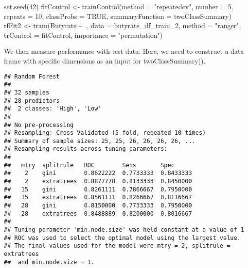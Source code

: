 \documentclass[
  oneside]{book}
\newenvironment{Shaded}{\begin{snugshade}}{\end{snugshade}}
\newcommand{\AttributeTok}[1]{\textcolor[rgb]{0.77,0.63,0.00}{#1}}
\newcommand{\CommentTok}[1]{\textcolor[rgb]{0.56,0.35,0.01}{\textit{#1}}}
\newcommand{\ConstantTok}[1]{\textcolor[rgb]{0.00,0.00,0.00}{#1}}
\newcommand{\DecValTok}[1]{\textcolor[rgb]{0.00,0.00,0.81}{#1}}
\newcommand{\FunctionTok}[1]{\textcolor[rgb]{0.00,0.00,0.00}{#1}}
\newcommand{\NormalTok}[1]{#1}
\newcommand{\OtherTok}[1]{\textcolor[rgb]{0.56,0.35,0.01}{#1}}
\newcommand{\SpecialCharTok}[1]{\textcolor[rgb]{0.00,0.00,0.00}{#1}}
\newcommand{\StringTok}[1]{\textcolor[rgb]{0.31,0.60,0.02}{#1}}
\begin{document}
\begin{Shaded}
\begin{Highlighting}[]
\FunctionTok{set.seed}\NormalTok{(}\DecValTok{42}\NormalTok{)}
\NormalTok{fitControl }\OtherTok{\textless{}{-}} \FunctionTok{trainControl}\NormalTok{(}\AttributeTok{method =} \StringTok{"repeatedcv"}\NormalTok{, }\AttributeTok{number =} \DecValTok{5}\NormalTok{, }\AttributeTok{repeats =} \DecValTok{10}\NormalTok{, }\AttributeTok{classProbs =} \ConstantTok{TRUE}\NormalTok{, }\AttributeTok{summaryFunction =}\NormalTok{ twoClassSummary)}
\NormalTok{rfFit2 }\OtherTok{\textless{}{-}} \FunctionTok{train}\NormalTok{(Butyrate }\SpecialCharTok{\textasciitilde{}}\NormalTok{ ., }\AttributeTok{data =}\NormalTok{ butyrate\_df\_train\_2, }
                \AttributeTok{method =} \StringTok{"ranger"}\NormalTok{, }
                \AttributeTok{trControl =}\NormalTok{ fitControl,}
                \AttributeTok{importance =} \StringTok{"permutation"}\NormalTok{)}
\end{Highlighting}
\end{Shaded}

We then measure performance with test data. Here, we need to construct a data frame with
specific dimensions as an input for twoClassSummary().

\begin{Shaded}
\end{Shaded}

\begin{verbatim}
## Random Forest 
## 
## 32 samples
## 28 predictors
##  2 classes: 'High', 'Low' 
## 
## No pre-processing
## Resampling: Cross-Validated (5 fold, repeated 10 times) 
## Summary of sample sizes: 25, 25, 26, 26, 26, 26, ... 
## Resampling results across tuning parameters:
## 
##   mtry  splitrule   ROC        Sens       Spec     
##    2    gini        0.8622222  0.7733333  0.8433333
##    2    extratrees  0.8877778  0.8133333  0.8450000
##   15    gini        0.8261111  0.7866667  0.7950000
##   15    extratrees  0.8561111  0.8266667  0.8116667
##   28    gini        0.8150000  0.7733333  0.7950000
##   28    extratrees  0.8488889  0.8200000  0.8016667
## 
## Tuning parameter 'min.node.size' was held constant at a value of 1
## ROC was used to select the optimal model using the largest value.
## The final values used for the model were mtry = 2, splitrule = extratrees
##  and min.node.size = 1.
\end{verbatim}
\end{document}
